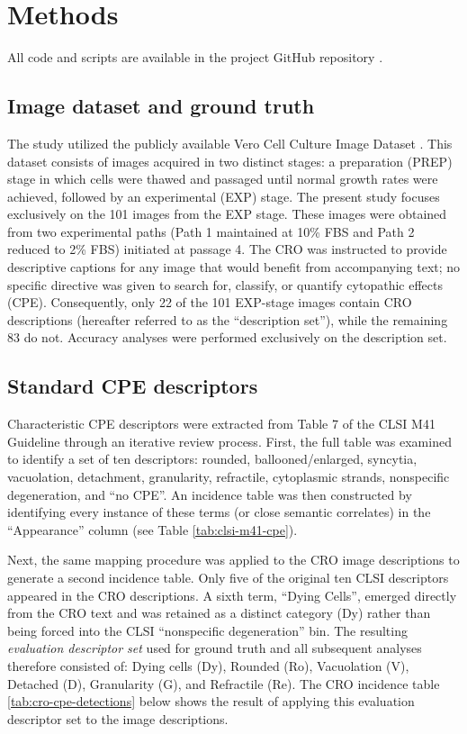 \documentclass[12pt,a4paper]{article}
\begin{document}
\section{Methods}
All code and scripts are available in the project GitHub repository \cite{github-verocell}.

\subsection{Image dataset and ground truth}
The study utilized the publicly available Vero Cell Culture Image Dataset \cite{mathews2025}. This dataset consists of images acquired in two distinct stages: a preparation (PREP) stage in which cells were thawed and passaged until normal growth rates were achieved, followed by an experimental (EXP) stage. The present study focuses exclusively on the 101 images from the EXP stage. These images were obtained from two experimental paths (Path 1 maintained at 10\% FBS and Path 2 reduced to 2\% FBS) initiated at passage 4. The CRO was instructed to provide descriptive captions for any image that would benefit from accompanying text; no specific directive was given to search for, classify, or quantify cytopathic effects (CPE). Consequently, only 22 of the 101 EXP-stage images contain CRO descriptions (hereafter referred to as the ``description set''), while the remaining 83 do not. Accuracy analyses were performed exclusively on the description set.

\subsection{Standard CPE descriptors}
Characteristic CPE descriptors were extracted from Table 7 of the CLSI M41 Guideline \cite{clsi} through an iterative review process. First, the full table was examined to identify a set of ten descriptors: rounded, ballooned/enlarged, syncytia, vacuolation, detachment, granularity, refractile, cytoplasmic strands, nonspecific degeneration, and ``no CPE''. An incidence table was then constructed by identifying every instance of these terms (or close semantic correlates) in the ``Appearance'' column (see Table \ref{tab:clsi-m41-cpe}).



Next, the same mapping procedure was applied to the CRO image descriptions to generate a second incidence table. Only five of the original ten CLSI descriptors appeared in the CRO descriptions. A sixth term, ``Dying Cells'', emerged directly from the CRO text and was retained as a distinct category (Dy) rather than being forced into the CLSI ``nonspecific degeneration'' bin. The resulting \textit{evaluation descriptor set} used for ground truth and all subsequent analyses therefore consisted of: Dying cells (Dy), Rounded (Ro), Vacuolation (V), Detached (D), Granularity (G), and Refractile (Re). The CRO incidence table \ref{tab:cro-cpe-detections} below shows the result of applying this evaluation descriptor set to the image descriptions.
\end{document}
